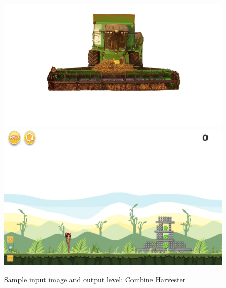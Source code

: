 \documentclass{dalthesis}
\begin{document}
\begin{figure}
	\caption{Sample input image and output level: Combine Harvester}
  \includegraphics[width=\textwidth,height=\textheight,keepaspectratio]{levels/pictures/mechanisms/combine_harvester.jpg}
  \includegraphics[width=\textwidth,height=\textheight,keepaspectratio]{levels/screenshots/mechanisms/combine_harvester.png}
\end{figure}
\end{document}
